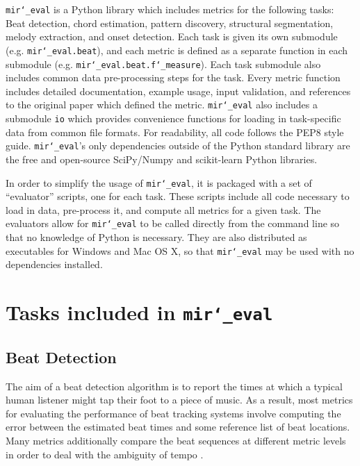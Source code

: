 \documentclass{article}
\def\mireval{\texttt{mir\char`_eval}}
\begin{document}
\mireval{} is a Python library which includes metrics for the following tasks: Beat detection, chord estimation, pattern discovery, structural segmentation, melody extraction, and onset detection.
Each task is given its own submodule (e.g. \mireval{}\texttt{.beat}), and each metric is defined as a separate function in each submodule (e.g. \mireval{}\texttt{.beat.f\char`_measure}).
Each task submodule also includes common data pre-processing steps for the task.
Every metric function includes detailed documentation, example usage, input validation, and references to the original paper which defined the metric.
\mireval{} also includes a submodule \texttt{io} which provides convenience functions for loading in task-specific data from common file formats.
For readability, all code follows the PEP8 style guide\cite{van2001pep}.
\mireval{}'s only dependencies outside of the Python standard library are the free and open-source SciPy/Numpy\cite{jones2001scipy} and scikit-learn\cite{pedregosa2011scikit} Python libraries.

In order to simplify the usage of \mireval{}, it is packaged with a set of ``evaluator'' scripts, one for each task.
These scripts include all code necessary to load in data, pre-process it, and compute all metrics for a given task.
The evaluators allow for \mireval{} to be called directly from the command line so that no knowledge of Python is necessary.
They are also distributed as executables for Windows and Mac OS X, so that \mireval{} may be used with no dependencies installed.

\section{Tasks included in \mireval{}}
\label{sec:tasks}

\subsection{Beat Detection}

The aim of a beat detection algorithm is to report the times at which a typical human listener might tap their foot to a piece of music.
As a result, most metrics for evaluating the performance of beat tracking systems involve computing the error between the estimated beat times and some reference list of beat locations.
Many metrics additionally compare the beat sequences at different metric levels in order to deal with the ambiguity of tempo \cite{levy2011improving}.
\end{document}
